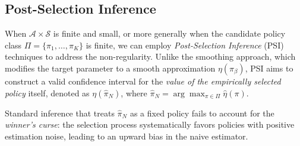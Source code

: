 \documentclass[12pt]{article}
\theoremstyle{remark}\newtheorem{remark}[theorem]{Remark}\theoremstyle{plain}
\begin{document}
\subsection{Post-Selection Inference }\label{sec:PSI}


When $\mathcal{A} \times \mathcal{S}$ is finite and small, or more generally when the candidate policy class $\Pi = \{ \pi_1, \dots, \pi_K \}$ is finite, we can employ \textit{Post-Selection Inference} (PSI) techniques to address the non-regularity. Unlike the smoothing approach, which modifies the target parameter to a smooth approximation $\eta(\pi_{\beta})$, PSI aims to construct a valid confidence interval for the \textit{value of the empirically selected policy} itself, denoted as $\eta(\widehat{\pi}_N)$, where $\widehat{\pi}_N = \arg\max_{\pi \in \Pi} \widehat{\eta}(\pi)$.

Standard inference that treats $\widehat{\pi}_N$ as a fixed policy fails to account for the \textit{winner's curse}: the selection process systematically favors policies with positive estimation noise, leading to an upward bias in the naive estimator. 
\end{document}

